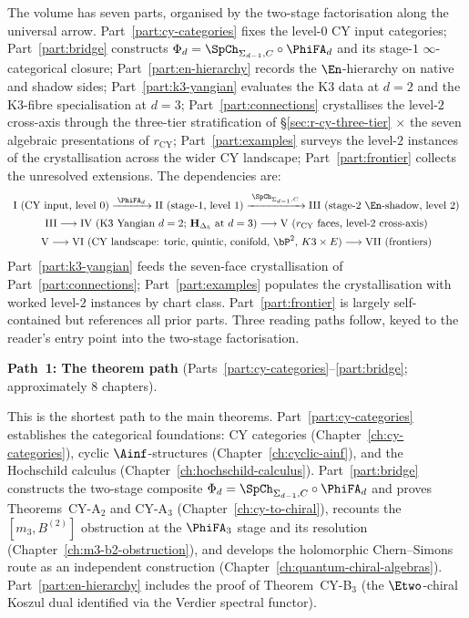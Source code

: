 The volume has seven parts, organised by the two-stage
factorisation along the universal arrow. Part~\ref{part:cy-categories}
fixes the level-$0$ CY input categories; Part~\ref{part:bridge}
constructs $\Phi_d = \SpCh_{\Sigma_{d-1}, C}\circ\PhiFA_d$ and its
stage-$1$ $\infty$-categorical closure; Part~\ref{part:en-hierarchy}
records the $\En$-hierarchy on native and shadow sides;
Part~\ref{part:k3-yangian} evaluates the K3 data at $d = 2$ and the
K3-fibre specialisation at $d = 3$;
Part~\ref{part:connections} crystallises the level-$2$ cross-axis
through the three-tier stratification of \S\ref{sec:r-cy-three-tier}
$\times$ the seven algebraic presentations of $r_{\mathrm{CY}}$;
Part~\ref{part:examples} surveys the level-$2$ instances of the
crystallisation across the wider CY landscape;
Part~\ref{part:frontier} collects the unresolved extensions. The
dependencies are:
\[
\begin{array}{c}
\text{I (CY input, level 0)}
\xrightarrow{\;\PhiFA_d\;}
\text{II (stage-1, level 1)}
\xrightarrow{\;\SpCh_{\Sigma_{d-1}, C}\;}
\text{III (stage-2 $\En$-shadow, level 2)} \\[0.5em]
\text{III}
\longrightarrow
\text{IV (K3 Yangian $d = 2$; $\mathbf{H}_{\Delta_5}$ at $d = 3$)}
\longrightarrow
\text{V ($r_{\mathrm{CY}}$ faces, level-2 cross-axis)} \\[0.5em]
\text{V}
\longrightarrow
\text{VI (CY landscape: toric, quintic, conifold, $\bP^2$, $K3 \times E$)}
\longrightarrow
\text{VII (frontiers)}
\end{array}
\]
Part~\ref{part:k3-yangian} feeds the seven-face crystallisation of
Part~\ref{part:connections}; Part~\ref{part:examples} populates the
crystallisation with worked level-$2$ instances by chart class.
Part~\ref{part:frontier} is largely self-contained but references
all prior parts. Three reading paths follow, keyed to the reader's
entry point into the two-stage factorisation.

\medskip

\noindent\textbf{Path~1: The theorem path}
(Parts~\ref{part:cy-categories}--\ref{part:bridge};
approximately 8 chapters).

\smallskip

\noindent
This is the shortest path to the main theorems.
Part~\ref{part:cy-categories} establishes the categorical
foundations: CY categories (Chapter~\ref{ch:cy-categories}),
cyclic $\Ainf$-structures (Chapter~\ref{ch:cyclic-ainf}), and
the Hochschild calculus (Chapter~\ref{ch:hochschild-calculus}).
Part~\ref{part:bridge} constructs the two-stage composite
$\Phi_d = \SpCh_{\Sigma_{d-1}, C}\circ\PhiFA_d$ and proves
Theorems~CY-A$_2$ and CY-A$_3$
(Chapter~\ref{ch:cy-to-chiral}), recounts the
$[m_3, B^{(2)}]$ obstruction at the $\PhiFA_3$ stage and its
resolution (Chapter~\ref{ch:m3-b2-obstruction}), and develops
the holomorphic Chern--Simons route as an independent
construction (Chapter~\ref{ch:quantum-chiral-algebras}).
Part~\ref{part:en-hierarchy} includes the proof of
Theorem~CY-B$_3$ (the $\Etwo$-chiral Koszul dual identified
via the Verdier spectral functor).

